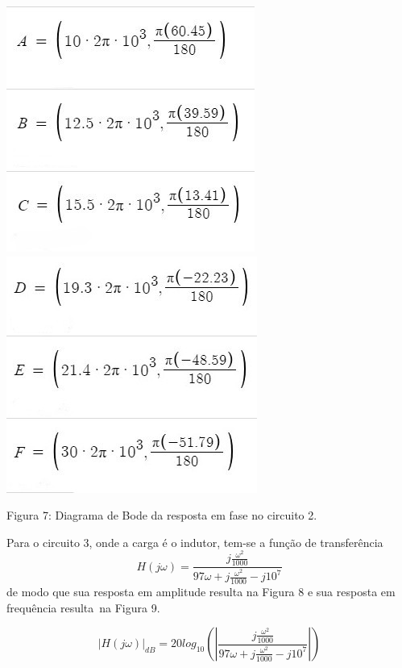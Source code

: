 \documentclass[a4 paper]{article}
\begin{document}
\begin{table}[h]
\centering
\includegraphics[scale=0.5]{figuras/pontosfase2-1}\includegraphics[scale=0.5]{figuras/pontosfase2}
\end{table}
\begin{center}
Figura 7: Diagrama de Bode da resposta em fase no circuito 2.
\end{center}

Para o circuito 3, onde a carga é o indutor, tem-se a função de transferência $$H(j\omega)=\frac{j\frac{\omega^2}{1000}}{97\omega+j\frac{\omega^2}{1000}-j10^7}$$ de modo que sua resposta em amplitude resulta na Figura 8 e sua resposta em frequência resulta na Figura 9.

\[|H(j\omega)|_{dB} = 20log_{10}\left(\left| \frac{j\frac{\omega^2}{1000}}{97\omega+j\frac{\omega^2}{1000}-j10^7} \right|\right)   \]
\end{document}
